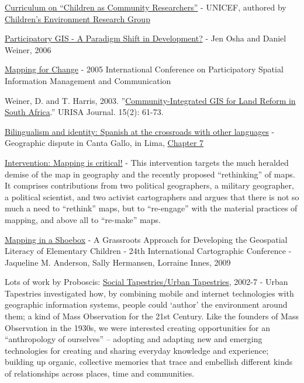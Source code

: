 \documentclass[11pt]{report}
\begin{document}
\href{http://www.unicef.org/teachers/researchers/intro.htm}{Curriculum on ``{}Children as Community Researchers''{}} - UNICEF, authored by \href{http://web.gc.cuny.edu/che/cerg/about_cerg/environmental_learning_index.htm}{Children'{}s Environment Research Group}

\href{http://www.directionsmag.com/article.php?article_id=2365&trv=1.}{Participatory GIS - A Paradigm Shift in Development?} - Jen Osha and Daniel Weiner, 2006

\href{http://www.iapad.org/pgis2005/}{Mapping for Change} - 2005 International Conference on Participatory Spatial Information Management and Communication

Weiner, D. and T. Harris, 2003. ''{}\href{http://www.rri.wvu.edu/pdffiles/gisweiner.pdf}{Community-Integrated GIS for Land Reform in South Africa}.''{} URISA Journal. 15(2): 61-73.

\href{http://books.google.com/books?hl=en&lr=&id=_VK-ABCKlVgC&oi=fnd&pg=PA3&dq=Nino+Bariola&ots=_r1wMwjiou&sig=TH0Gn1P27Xtsdq2Oc0Up5D6HLzg#v=onepage&q=Nino%20Bariola&f=false}{Bilingualism and identity: Spanish at the crossroads with other languages} - Geographic dispute in Canta Gallo, in Lima, \href{http://books.google.com/books?id=_VK-ABCKlVgC&lpg=PA3&ots=_r1wMwjiou&dq=Nino%20Bariola&lr=&pg=PA153#v=onepage&q=&f=true}{Chapter 7}

\href{http://www.sciencedirect.com/science?_ob=ArticleURL&_udi=B6VG2-4XHJX4B-1&_user=10&_coverDate=08/31/2009&_rdoc=1&_fmt=high&_orig=search&_sort=d&_docanchor=&view=c&_searchStrId=1186930669&_rerunOrigin=google&_acct=C000050221&_version=1&_urlVersion=0&_userid=10&md5=a9327ffa62e089e863f892a4551c1717}{Intervention: Mapping is critical!} - This intervention targets the much heralded demise of the map in geography and the recently proposed “rethinking” of maps. It comprises contributions from two political geographers, a military geographer, a political scientist, and two activist cartographers and argues that there is not so much a need to “rethink” maps, but to “re-engage” with the material practices of mapping, and above all to “re-make” maps.

\href{http://training.esri.com/campus/library/bibliography/RecordDetail.cfm?ID=95545&browseonly=0}{Mapping in a Shoebox} - A Grassroots Approach for Developing the Geospatial Literacy of Elementary Children - 24th International Cartographic Conference - Jaqueline M. Anderson, Sally Hermansen, Lorraine Innes, 2009

Lots of work by Proboscis: \href{http://urbantapestries.net/}{Social Tapestries/Urban Tapestries}, 2002-7 - Urban Tapestries investigated how, by combining mobile and internet technologies with geographic information systems, people could `{}author'{} the environment around them; a kind of Mass Observation for the 21st Century. Like the founders of Mass Observation in the 1930s, we were interested creating opportunities for an ``{}anthropology of ourselves''{} – adopting and adapting new and emerging technologies for creating and sharing everyday knowledge and experience; building up organic, collective memories that trace and embellish different kinds of relationships across places, time and communities.
\end{document}
